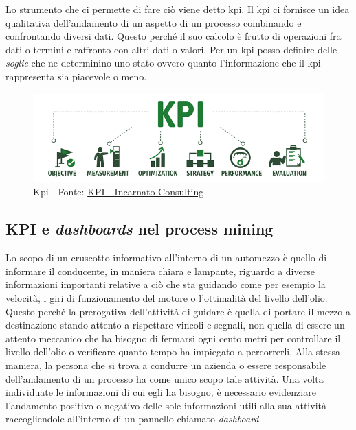 Lo strumento che ci permette di fare ciò viene detto \acrshort{kpi}. Il \acrlong{kpi} ci fornisce un idea qualitativa dell'andamento di un aspetto di un processo combinando e confrontando diversi dati.
Questo perché il suo calcolo è frutto di operazioni fra dati o termini e raffronto con altri dati o valori.
Per un \acrshort{kpi} posso definire delle \emph{soglie} che ne determinino uno stato ovvero quanto l'informazione che il kpi rappresenta sia piacevole o meno.
\begin{figure}[H]
    \centering
    \includegraphics[width=0.80\columnwidth]{immagini/kpi.png}
    \caption{Kpi - Fonte: \href{https://incarnato.consulting/kpi-cosa-utilizzarli-nella-tua-impresa/}{KPI - Incarnato Consulting}}
    \label{fig:my_label}
\end{figure}
\subsection{KPI e \textit{dashboards} nel process mining}
Lo scopo di un cruscotto informativo all'interno di un automezzo è quello di informare il conducente, in maniera chiara e lampante, riguardo a diverse informazioni importanti relative a ciò che sta guidando come per esempio la velocità, i giri di funzionamento del motore o l'ottimalità del livello dell'olio. Questo perché la prerogativa dell'attività di guidare è quella di portare il mezzo a destinazione stando attento a rispettare vincoli e segnali, non quella di essere un attento meccanico che ha bisogno di fermarsi ogni cento metri per controllare il livello dell'olio o verificare quanto tempo ha impiegato a percorrerli. Alla stessa maniera, la persona che si trova a condurre un azienda o essere responsabile dell'andamento di un processo ha come unico scopo tale attività. Una volta individuate le informazioni di cui egli ha bisogno, è necessario evidenziare l'andamento positivo o negativo delle sole informazioni utili alla sua attività raccogliendole all'interno di un pannello chiamato \textit{dashboard}.

